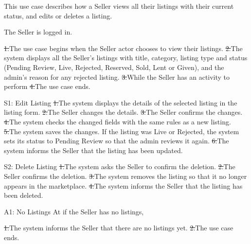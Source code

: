 This use case describes how a Seller views all their listings with their current status, and edits or deletes a listing.\par
{}
The Seller is logged in.\par
{}
\st{1.}{The use case begins when the Seller actor chooses to view their listings.}
\st{2.}{The system displays all the Seller's listings with title, category, listing type and status (Pending Review, Live, Rejected, Reserved, Sold, Lent or Given), and the admin's reason for any rejected listing.}
\st{3.}{While the Seller has an activity to perform}
\st{4.}{The use case ends.}
\begin{flowblock}{S1: Edit Listing}
\st{1.}{The system displays the details of the selected listing in the listing form.}
\st{2.}{The Seller changes the details.}
\st{3.}{The Seller confirms the changes.}
\st{4.}{The system checks the changed fields with the same rules as a new listing.}
\st{5.}{The system saves the changes. If the listing was Live or Rejected, the system sets its status to Pending Review so that the admin reviews it again.}
\st{6.}{The system informs the Seller that the listing has been updated.}
\end{flowblock}
\begin{flowblock}{S2: Delete Listing}
\st{1.}{The system asks the Seller to confirm the deletion.}
\st{2.}{The Seller confirms the deletion.}
\st{3.}{The system removes the listing so that it no longer appears in the marketplace.}
\st{4.}{The system informs the Seller that the listing has been deleted.}
\end{flowblock}
\begin{flowblock}{A1: No Listings}
At  if the Seller has no listings,\par
\st{1.}{The system informs the Seller that there are no listings yet.}
\st{2.}{The use case ends.}
\end{flowblock}

